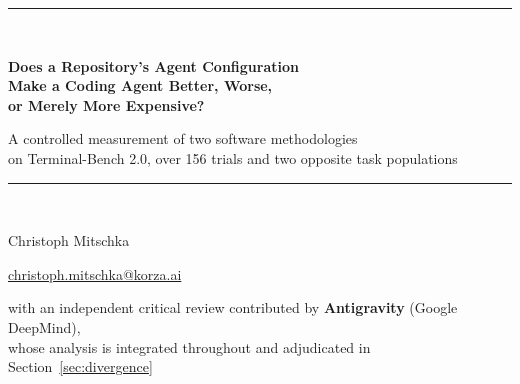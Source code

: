 \documentclass[11pt,a4paper]{article}
\begin{document}
\begin{titlepage}
\centering
\vspace*{2.2cm}
{\color{accent}\rule{\linewidth}{1.2pt}}\\[0.7cm]
{\LARGE\bfseries Does a Repository's Agent Configuration\\[0.25cm]
Make a Coding Agent Better, Worse,\\[0.25cm] or Merely More Expensive?\par}
\vspace{0.5cm}
{\large A controlled measurement of two software methodologies\\
on Terminal-Bench 2.0, over 156 trials and two opposite task populations\par}
\vspace{0.4cm}
{\color{accent}\rule{\linewidth}{1.2pt}}\\[1.2cm]

{\large Christoph Mitschka\par}
\vspace{0.15cm}
{\small \href{mailto:christoph.mitschka@korza.ai}{christoph.mitschka@korza.ai}\par}
\vspace{0.4cm}
{\small with an independent critical review contributed by \textbf{Antigravity} (Google DeepMind),\\
whose analysis is integrated throughout and adjudicated in Section~\ref{sec:divergence}\par}
\vspace{1.4cm}


\end{titlepage}
\end{document}
